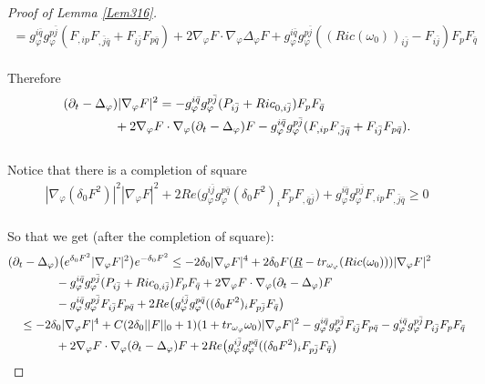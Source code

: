 \documentclass[11pt]{amsart}
\numberwithin{equation}{section}
\begin{document}
\begin{proof}[Proof of Lemma \ref{Lem316}]
\begin{align}
	=g_{\varphi}^{i\bar{q}}g_{\varphi}^{p\bar{j}}(F_{,ip}F_{,\bar{j}\bar{q}}+F_{i\bar{j}}F_{p\bar{q}}) + 2\nabla_{\varphi}F\cdot \nabla_{\varphi}\Delta_{\varphi}F + g_{\varphi}^{i\bar{q}}g_{\varphi}^{p\bar{j}} \left( (Ric(\omega_0))_{i\bar{j}}-F_{i\bar j}\right) F_pF_{\bar{q}}
\end{align}\\
Therefore
\begin{align}
	& (\partial_t-\Delta_{\varphi})|\nabla_{\varphi}F|^2 =-g_{\varphi}^{i\bar{q}}g_{\varphi}^{p\bar{j}}(P_{i\bar{j}}+Ric_{0,i\bar j}) F_pF_{\bar{q}} \notag\\
	&\qquad\qquad +2\nabla_{\varphi}F\cdot \nabla_{\varphi}(\partial_t-\Delta_{\varphi})F -g_{\varphi}^{i\bar{q}}g_{\varphi}^{p\bar{j}}(F_{,ip}F_{,\bar{j}\bar{q}}+F_{i\bar{j}}F_{p\bar{q}}).
\end{align}\\
Notice that there is a completion of square
\begin{align}
	|\nabla_{\varphi}(\delta_0F^2)|^2|\nabla_{\varphi}F|^2 + 2Re\big(g_{\varphi}^{i\bar{j}}g_{\varphi}^{p\bar{q}}(\delta_0 F^2)_iF_pF_{,\bar{q}\bar{j}} \big) +g_{\varphi}^{i\bar{q}}g_{\varphi}^{p\bar{j}}F_{,ip}F_{,\bar{j}\bar{q}} \ge  0
\end{align}\\
So that we get (after the completion of square):
\begin{align}
	& (\partial_t-\Delta_{\varphi})\big(e^{\delta_0F^2}|\nabla_{\varphi}F|^2\big)e^{-\delta_0F^2} \le  -2\delta_0|\nabla_{\varphi}F|^4 + 2\delta_0 F (\underline{R}-tr_{\omega_{\varphi}}(Ric(\omega_0))) |\nabla_{\varphi}F|^2 \notag \\
	&\qquad \qquad -g_{\varphi}^{i\bar{q}}g_{\varphi}^{p\bar{j}}(P_{i\bar{j}}+Ric_{0,i\bar j}) F_pF_{\bar{q}} +2\nabla_{\varphi}F\cdot \nabla_{\varphi}(\partial_t-\Delta_{\varphi})F \notag\\
	&\qquad\qquad -g_{\varphi}^{i\bar{q}}g_{\varphi}^{p\bar{j}}F_{i\bar{j}}F_{p\bar{q}} + 2Re\big(g_{\varphi}^{i\bar{j}}g_{\varphi}^{p\bar{q}}((\delta_0 F^2)_iF_{p\bar{j}}F_{\bar{q}}\big) \notag\\
	&\quad \le  -2\delta_0|\nabla_{\varphi}F|^4 + C(2\delta_0 ||F||_0 +1)(1+tr_{\omega_{\varphi}}\omega_0) |\nabla_\varphi F|^2 -g_{\varphi}^{i\bar{q}}g_{\varphi}^{p\bar{j}}F_{i\bar{j}}F_{p\bar{q}} - g_{\varphi}^{i\bar{q}}g_{\varphi}^{p\bar{j}}P_{i\bar{j}} F_pF_{\bar{q}} \notag\\
	&\qquad\qquad  +2\nabla_{\varphi}F\cdot \nabla_{\varphi}(\partial_t-\Delta_{\varphi})F + 2Re\big(g_{\varphi}^{i\bar{j}}g_{\varphi}^{p\bar{q}}((\delta_0 F^2)_iF_{p\bar{j}}F_{\bar{q}}\big) 

\end{align}
\end{proof}
\end{document}
